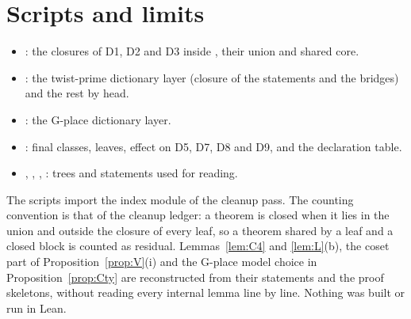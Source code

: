 \documentclass[11pt]{article}
\theoremstyle{definition}
\theoremstyle{remark}
\begin{document}
\section{Scripts and limits}
\begin{itemize}[leftmargin=*,itemsep=1pt]
\item {}: the closures of D1, D2 and D3 inside , their union and shared core.
\item {}: the twist-prime dictionary layer (closure of the  statements and the bridges) and the rest by head.
\item {}: the G-place dictionary layer.
\item {}: final classes, leaves, effect on D5, D7, D8 and D9, and the declaration table.
\item {}, , , : trees and statements used for reading.
\end{itemize}
The scripts import the index module  of the cleanup pass. The counting convention is that of the cleanup ledger: a theorem is closed when it lies in the union and outside the closure of every leaf, so a theorem shared by a leaf and a closed block is counted as residual. Lemmas~\ref{lem:C4} and \ref{lem:L}(b), the coset part of Proposition~\ref{prop:V}(i) and the G-place model choice in Proposition~\ref{prop:Cty} are reconstructed from their statements and the proof skeletons, without reading every internal lemma line by line. Nothing was built or run in Lean.
\end{document}

